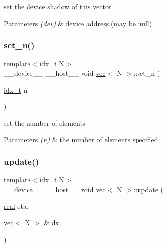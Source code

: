 set the device shadow of this vector 


\begin{DoxyParams}{Parameters}
{\em (dev)} & device address (may be null) \\
\hline
\end{DoxyParams}
\mbox{\label{structvec_a90d5638b2de8e3a87d954130dc6d505e}} 
\subsubsection{\texorpdfstring{set\+\_\+n()}{set\_n()}}
{\footnotesize\ttfamily template$<$idx\+\_\+t N$>$ \\
\+\_\+\+\_\+device\+\_\+\+\_\+ \+\_\+\+\_\+host\+\_\+\+\_\+ void \hyperlink{structvec}{vec}$<$ N $>$\+::set\+\_\+n (\begin{DoxyParamCaption}\item[{\hyperlink{vgg__util_8h_a8e93478a00e685bea5e6a3f617bf03a3}{idx\+\_\+t}}]{n }\end{DoxyParamCaption})\hspace{0.3cm}{\ttfamily [inline]}}



set the number of elements 


\begin{DoxyParams}{Parameters}
{\em (n)} & the number of elements specified \\
\hline
\end{DoxyParams}
\mbox{\label{structvec_a7e0e7a2cfeeb98471a9ee4c8ea832308}} 
\subsubsection{\texorpdfstring{update()}{update()}}
{\footnotesize\ttfamily template$<$idx\+\_\+t N$>$ \\
\+\_\+\+\_\+device\+\_\+\+\_\+ \+\_\+\+\_\+host\+\_\+\+\_\+ void \hyperlink{structvec}{vec}$<$ N $>$\+::update (\begin{DoxyParamCaption}\item[{\hyperlink{vgg__util_8h_a1082d08aaa761215ec83e7149f27ad16}{real}}]{eta,  }\item[{\hyperlink{structvec}{vec}$<$ N $>$ \&}]{dx }\end{DoxyParamCaption})\hspace{0.3cm}{\ttfamily [inline]}}



